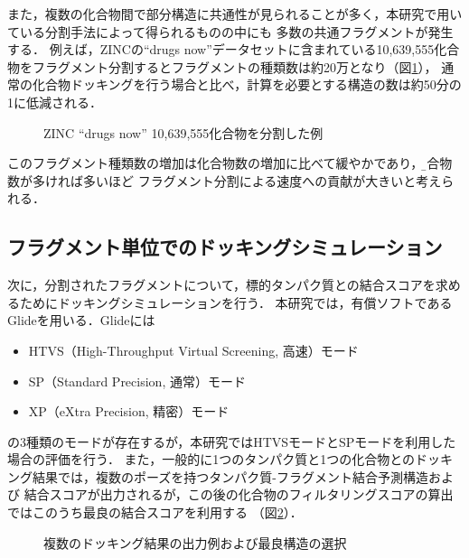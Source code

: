 また，複数の化合物間で部分構造に共通性が見られることが多く，本研究で用いている分割手法によって得られるものの中にも
多数の共通フラグメントが発生する．
例えば，ZINCの``drugs now''データセットに含まれている10,639,555化合物をフラグメント分割するとフラグメントの種類数は約20万となり（図\ref{fig:decomposition_amount}），
通常の化合物ドッキングを行う場合と比べ，計算を必要とする構造の数は約50分の1に低減される．
\begin{figure}[htp]
 \begin{center}
  \caption{ZINC ``drugs now'' 10,639,555化合物を分割した例}
  \label{fig:decomposition_amount}
 \end{center}
\end{figure}
このフラグメント種類数の増加は化合物数の増加に比べて緩やかであり，\b{化合物数が多ければ多いほど
フラグメント分割による速度への貢献が大きい}と考えられる．

\subsection{フラグメント単位でのドッキングシミュレーション}
次に，分割されたフラグメントについて，標的タンパク質との結合スコアを求めるためにドッキングシミュレーションを行う．
本研究では，有償ソフトであるGlide\cite{Friesner2004}を用いる．Glideには
\begin{itemize}
\item HTVS（High-Throughput Virtual Screening, 高速）モード
\item SP（Standard Precision, 通常）モード
\item XP（eXtra Precision, 精密）モード
\end{itemize}
の3種類のモードが存在するが，本研究ではHTVSモードとSPモードを利用した場合の評価を行う．
また，一般的に1つのタンパク質と1つの化合物とのドッキング結果では，複数のポーズを持つタンパク質-フラグメント結合予測構造および
結合スコアが出力されるが，この後の化合物のフィルタリングスコアの算出ではこのうち最良の結合スコアを利用する
（図\ref{fig:fragment_result}）．

\begin{figure}[t]
\begin{minipage}{0.5\hsize}
 \begin{center}
 \end{center}
\end{minipage}
\begin{minipage}{0.5\hsize}
 \begin{center}
 \end{center}
\end{minipage}
 \caption{複数のドッキング結果の出力例および最良構造の選択}
 \label{fig:fragment_result}
\end{figure}

